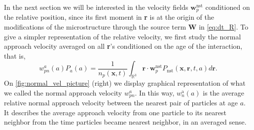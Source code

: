 In the next section we will be interested in the velocity fields $\textbf{w}_p^\text{nst}$ conditioned on the relative position, since its first moment in \textbf{r} is at the origin of the modifications of the microstructure through the source term \textbf{W} in \ref{eq:dt_R}. 
To give a simpler representation of the relative velocity, we first study the normal approach velocity averaged on all \textbf{r}'s conditioned on the age of the interaction, that is,  
\begin{equation*}
    w_{pn}^a (a)P_a(a)
    = \frac{1}{n_p(\textbf{x},t)}
    \int_{\mathbb{R}^3}
    \textbf{r} \cdot \textbf{w}^\text{nst}_p
    P_\text{nst}(\textbf{x},\textbf{r},t,a) d\textbf{r}.
\end{equation*}
On \ref{fig:normal_vel_picture} (right) we display graphical representation of what we called the normal approach velocity $w_{pn}^a$. 
In this way, $w^\text{a}_n(a)$ is the average relative normal approach velocity between the nearest pair of particles at age $a$. 
It describes the average approach velocity from one particle to its nearest neighbor from the time particles became nearest neighbor, in an averaged sense. 
